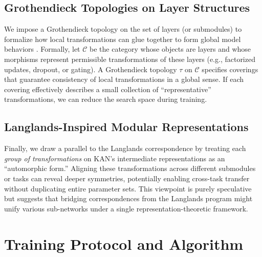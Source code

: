 \documentclass{article}
\begin{document}
\subsection{Grothendieck Topologies on Layer Structures}
We impose a Grothendieck topology on the set of layers (or submodules) to formalize how local transformations can glue together to form global model behaviors \citep{grothendieck1972}. Formally, let \(\mathcal{C}\) be the category whose objects are layers and whose morphisms represent permissible transformations of these layers (e.g., factorized updates, dropout, or gating). A Grothendieck topology \(\tau\) on \(\mathcal{C}\) specifies coverings that guarantee consistency of local transformations in a global sense. If each covering effectively describes a small collection of “representative” transformations, we can reduce the search space during training.

\subsection{Langlands-Inspired Modular Representations}
Finally, we draw a parallel to the Langlands correspondence by treating each \emph{group of transformations} on KAN’s intermediate representations as an “automorphic form.” Aligning these transformations across different submodules or tasks can reveal deeper symmetries, potentially enabling cross-task transfer without duplicating entire parameter sets. This viewpoint is purely speculative but suggests that bridging correspondences from the Langlands program might unify various sub-networks under a single representation-theoretic framework.

\section{Training Protocol and Algorithm}
\label{sec:training_protocol}
\end{document}
